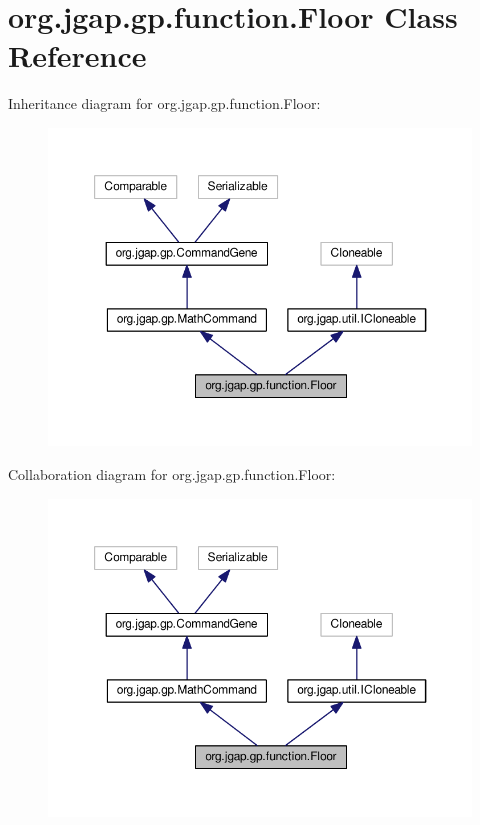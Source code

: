 \hypertarget{classorg_1_1jgap_1_1gp_1_1function_1_1_floor}{\section{org.\-jgap.\-gp.\-function.\-Floor Class Reference}
\label{classorg_1_1jgap_1_1gp_1_1function_1_1_floor}
}


Inheritance diagram for org.\-jgap.\-gp.\-function.\-Floor\-:
\nopagebreak
\begin{figure}[H]
\begin{center}
\leavevmode
\includegraphics[width=350pt]{classorg_1_1jgap_1_1gp_1_1function_1_1_floor__inherit__graph}
\end{center}
\end{figure}


Collaboration diagram for org.\-jgap.\-gp.\-function.\-Floor\-:
\nopagebreak
\begin{figure}[H]
\begin{center}
\leavevmode
\includegraphics[width=350pt]{classorg_1_1jgap_1_1gp_1_1function_1_1_floor__coll__graph}
\end{center}
\end{figure}
